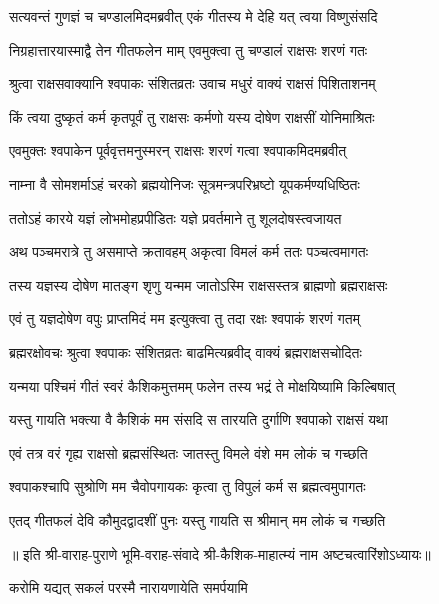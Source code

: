\twolineshloka
{सत्यवन्तं गुणज्ञं च चण्डालमिदमब्रवीत्}
{एकं गीतस्य मे देहि यत् त्वया विष्णुसंसदि}%

\twolineshloka
{निग्रहात्तारयास्माद्वै तेन गीतफलेन माम्}
{एवमुक्त्वा तु चण्डालं राक्षसः शरणं गतः}%

\twolineshloka
{श्रुत्वा राक्षसवाक्यानि श्वपाकः संशितव्रतः}
{उवाच मधुरं वाक्यं राक्षसं पिशिताशनम्}%

\twolineshloka
{किं त्वया दुष्कृतं कर्म कृतपूर्वं तु राक्षसः}
{कर्मणो यस्य दोषेण राक्षसीं योनिमाश्रितः}%

\twolineshloka
{एवमुक्तः श्वपाकेन पूर्ववृत्तमनुस्मरन्}
{राक्षसः शरणं गत्वा श्वपाकमिदमब्रवीत्}%

\twolineshloka
{नाम्ना वै सोमशर्माऽहं चरको ब्रह्मयोनिजः}
{सूत्रमन्त्रपरिभ्रष्टो यूपकर्मण्यधिष्ठितः}%

\twolineshloka
{ततोऽहं कारये यज्ञं लोभमोहप्रपीडितः}
{यज्ञे प्रवर्तमाने तु शूलदोषस्त्वजायत}%

\twolineshloka
{अथ पञ्चमरात्रे तु असमाप्ते क्रतावहम्}
{अकृत्वा विमलं कर्म ततः पञ्चत्वमागतः}%

\twolineshloka
{तस्य यज्ञस्य दोषेण मातङ्ग शृणु यन्मम}
{जातोऽस्मि राक्षसस्तत्र ब्राह्मणो ब्रह्मराक्षसः}%

\twolineshloka
{एवं तु यज्ञदोषेण वपुः प्राप्तमिदं मम}
{इत्युक्त्वा तु तदा रक्षः श्वपाकं शरणं गतम्}%

\twolineshloka
{ब्रह्मरक्षोवचः श्रुत्वा श्वपाकः संशितव्रतः}
{बाढमित्यब्रवीद् वाक्यं ब्रह्मराक्षसचोदितः}%

\twolineshloka
{यन्मया पश्चिमं गीतं स्वरं कैशिकमुत्तमम्}
{फलेन तस्य भद्रं ते मोक्षयिष्यामि किल्बिषात्}%


\twolineshloka
{यस्तु गायति भक्त्या वै कैशिकं मम संसदि}
{स तारयति दुर्गाणि श्वपाको राक्षसं यथा}%

\twolineshloka
{एवं तत्र वरं गृह्य राक्षसो ब्रह्मसंस्थितः}
{जातस्तु विमले वंशे मम लोकं च गच्छति}%

\twolineshloka
{श्वपाकश्चापि सुश्रोणि मम चैवोपगायकः}
{कृत्वा तु विपुलं कर्म स ब्रह्मत्वमुपागतः}%

\twolineshloka
{एतद् गीतफलं देवि कौमुदद्वादशीं पुनः}
{यस्तु गायति स श्रीमान् मम लोकं च गच्छति}%

॥ इति श्री-वाराह-पुराणे भूमि-वराह-संवादे श्री-कैशिक-माहात्म्यं नाम अष्टचत्वारिंशोऽध्यायः॥

{करोमि यद्यत् सकलं परस्मै नारायणायेति समर्पयामि}

